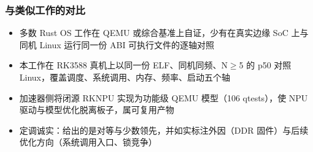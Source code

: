 \documentclass[aspectratio=169,11pt]{ctexbeamer}
\begin{document}
\begin{frame}
  \frametitle{与类似工作的对比}
  \begin{itemize}
    \item 多数 Rust OS 工作在 QEMU 或综合基准上自证，少有在真实边缘 SoC 上与同机 Linux 运行同一份 ABI 可执行文件的逐轴对照
    \item 本工作在 RK3588 真机上以同一份 ELF、同机同频、N$\geq$5 的 p50 对照 Linux，覆盖调度、系统调用、内存、频率、启动五个轴
    \item 加速器侧将闭源 RKNPU 实现为功能级 QEMU 模型（106 qtests），使 NPU 驱动与模型优化脱离板子，属可复用产物
    \item 定调诚实：给出的是对等与少数领先，并如实标注外因（DDR 固件）与后续优化方向（系统调用入口、锁竞争）
  \end{itemize}
\end{frame}
\end{document}
